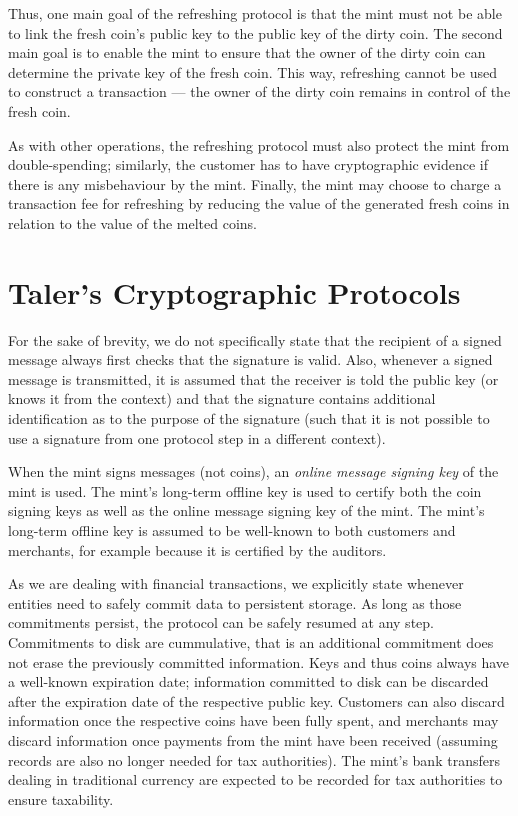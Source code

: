 \documentclass{llncs}
\begin{document}
Thus, one main goal of the refreshing protocol is that the mint must
not be able to link the fresh coin's public key to the public key of
the dirty coin.  The second main goal is to enable the mint to ensure
that the owner of the dirty coin can determine the private key of the
fresh coin.  This way, refreshing cannot be used to construct a
transaction --- the owner of the dirty coin remains in control of the
fresh coin.

As with other operations, the refreshing protocol must also protect
the mint from double-spending; similarly, the customer has to have
cryptographic evidence if there is any misbehaviour by the mint.
Finally, the mint may choose to charge a transaction fee for
refreshing by reducing the value of the generated fresh coins
in relation to the value of the melted coins.


\section{Taler's Cryptographic Protocols}


For the sake of brevity, we do not specifically state that the
recipient of a signed message always first checks that the signature
is valid.  Also, whenever a signed message is transmitted, it is
assumed that the receiver is told the public key (or knows it from the
context) and that the signature contains additional identification as
to the purpose of the signature (such that it is not possible to
use a signature from one protocol step in a different context).

When the mint signs messages (not coins), an {\em online message
  signing key} of the mint is used.  The mint's long-term offline key
is used to certify both the coin signing keys as well as the online
message signing key of the mint.  The mint's long-term offline key is
assumed to be well-known to both customers and merchants, for example
because it is certified by the auditors.

As we are dealing with financial transactions, we explicitly state
whenever entities need to safely commit data to persistent storage.
As long as those commitments persist, the protocol can be safely
resumed at any step.  Commitments to disk are cummulative, that is an
additional commitment does not erase the previously committed
information.  Keys and thus coins always have a well-known expiration
date; information committed to disk can be discarded after the
expiration date of the respective public key.  Customers can also
discard information once the respective coins have been fully spent,
and merchants may discard information once payments from the mint have
been received (assuming records are also no longer needed for tax
authorities).  The mint's bank transfers dealing in traditional
currency are expected to be recorded for tax authorities to ensure
taxability.
\end{document}
